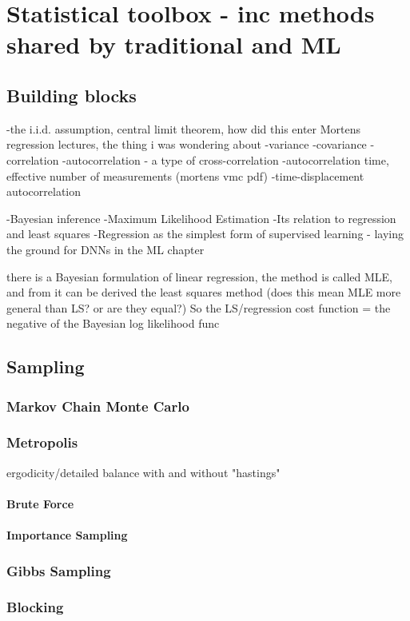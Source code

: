 \documentclass[twoside,english]{uiofysmaster}
\begin{document}
\chapter{Statistical toolbox - inc methods shared by traditional and ML}
\section{Building blocks}
-the i.i.d. assumption, central limit theorem, how did this enter Mortens regression lectures, the thing i was wondering about
-variance
-covariance
-correlation
-autocorrelation - a type of cross-correlation
-autocorrelation time, effective number of measurements (mortens vmc pdf)
-time-displacement autocorrelation

-Bayesian inference
-Maximum Likelihood Estimation
-Its relation to regression and least squares
-Regression as the simplest form of supervised learning - laying the ground for DNNs in the ML chapter

there is a Bayesian formulation of linear regression, the method is called MLE, and from it can be derived the least squares method (does this mean MLE more general than LS? or are they equal?)
So the LS/regression cost function = the negative of the Bayesian log likelihood func

\section{Sampling}
\subsection{Markov Chain Monte Carlo}
\subsection{Metropolis}
ergodicity/detailed balance
with and without "hastings"
\subsubsection{Brute Force}
\subsubsection{Importance Sampling}

\subsection{Gibbs Sampling}
\subsection{Blocking}
\end{document}
